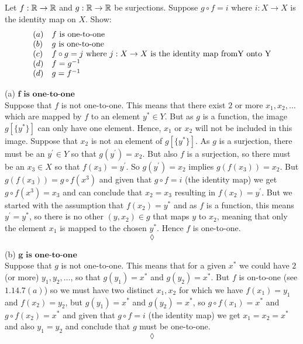 \subsection{}
\begin{tcolorbox}
Let $f:\mathbb{R}\rightarrow\mathbb{R}$ and $g:\mathbb{R}\rightarrow\mathbb{R}$ be surjections. Suppose $g\circ f=i$ where $i:X\rightarrow X$ is the identity map on $X$. Show: 
\begin{align*}
\begin{array}{ll}
(a)&f\text{ is one-to-one}\\
(b)&g\text{ is one-to-one}\\
(c)&f\circ g = j \text{ where } j:X\rightarrow X \text{ is the identity map from} $Y$ \text{ onto }$Y$\\
(d)&f=g^{-1}\\
(d)&g=f^{-1}
\end{array}
\end{align*}

\end{tcolorbox}
$$ $$ 
(a) $\mathbf{f\text{ is one-to-one}}$\\
Suppose that $f$ is not one-to-one. This means that there exist $2$ or more $x_1,x_2,\dots $ which are mapped by $f$ to an element $y^{*}\in Y$. But as $g$ is a function, the image $g[\{y^{*}\}]$ can only have one element. Hence, $x_1$ or $x_2$ will not be included in this image. Suppose that $x_2$ is not an element of $g[\{y^{*}\}]$. As $g$ is a surjection, there must be an $y^{'}\in Y$ so that $g(y^{'})= x_2$. But also $f$ is a surjection, so there must be an $x_3\in X$ so that $f(x_3)= y^{'}$. 
So $g(y^{'})= x_2$ implies $g(f(x_3))= x_2$. But $g(f(x_3))= g\circ f(x^3)$ and given that $g\circ f=i$ (the identity map) we get $g\circ f(x^3)=x_3$ and can conclude that $x_2=x_3$ resulting in $f(x_2)= y^{'}$. But we started with the assumption that $f(x_2)= y^{*}$ and as $f$ is a function, this means $y^{'}=y^{*}$, so there is no other $(y,x_2)\in g$ that maps $y$ to $x_2$, meaning that only the element $x_1$ is mapped to the chosen $y^{*}$. Hence $f$ is one-to-one.
$$\lozenge$$

(b) $\mathbf{g\text{ is one-to-one}}$\\
Suppose that $g$ is not one-to-one. This means that for a given $x^{*} $ we could have $2$ (or more) $y_1,y_2,\dots$, so that $g(y_1)=x^{*}$ and $g(y_2)=x^{*}$. But $f$ is on-to-one (see $1.14.7 (a)$) so we must have two distinct $x_1,x_2$ for which we have $f(x_1)=y_1$ and $f(x_2)=y_2$, but $g(y_1)=x^{*}$ and $g(y_2)=x^{*}$, so $g\circ f(x_1)=x^{*}$ and $g\circ f(x_2)=x^{*}$ and given that $g\circ f=i$ (the identity map) we get $x_1=x_2=x^{*}$ and also $y_1=y_2$ and conclude that $g$ must be one-to-one.
$$\lozenge$$

